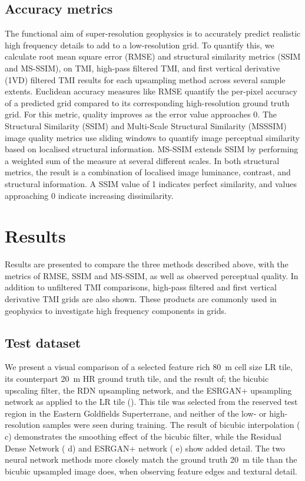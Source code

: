 \subsection{Accuracy metrics}
The functional aim of super-resolution geophysics is to accurately predict realistic high frequency details to add to a low-resolution grid.
To quantify this, we calculate root mean square error (RMSE) and structural similarity metrics (SSIM and MS-SSIM), on TMI, high-pass filtered TMI, and first vertical derivative (1VD) filtered TMI results for each upsampling method across several sample extents.
Euclidean accuracy measures like RMSE quantify the per-pixel accuracy of a predicted grid compared to its corresponding high-resolution ground truth grid.
For this metric, quality improves as the error value approaches \num{0}.
The Structural Similarity (SSIM) \parencite{wangImageQualityAssessment2004} and Multi-Scale Structural Similarity (MSSSIM) \parencite{wangMultiscaleStructuralSimilarity2003} image quality metrics use sliding windows to quantify image perceptual similarity based on localised structural information.
MS-SSIM extends SSIM by performing a weighted sum of the measure at several different scales.
In both structural metrics, the result is a combination of localised image luminance, contrast, and structural information.
A SSIM value of 1 indicates perfect similarity, and values approaching \num{0} indicate increasing dissimilarity.

\section{Results}
Results are presented to compare the three methods described above, with the metrics of RMSE, SSIM and MS-SSIM, as well as observed perceptual quality.
In addition to unfiltered TMI comparisons, high-pass filtered and first vertical derivative TMI grids are also shown.
These products are commonly used in geophysics to investigate high frequency components in grids.

\subsection{Test dataset}
We present a visual comparison of a selected feature rich \qty{80}{\metre} cell size LR tile, its counterpart \qty{20}{\metre} HR ground truth tile, and the result of; the bicubic upscaling filter, the RDN\textdaggerdbl{} upsampling network, and the ESRGAN+ upsampling network as applied to the LR tile ().
This tile was selected from the reserved test region in the Eastern Goldfields Superterrane, and neither of the low- or high-resolution samples were seen during training.
The result of bicubic interpolation ( c) demonstrates the smoothing effect of the bicubic filter, while the Residual Dense Network ( d) and ESRGAN+ network ( e) show added detail.
The two neural network methods more closely match the ground truth \qty{20}{\metre} tile than the bicubic upsampled image does, when observing feature edges and textural detail.

